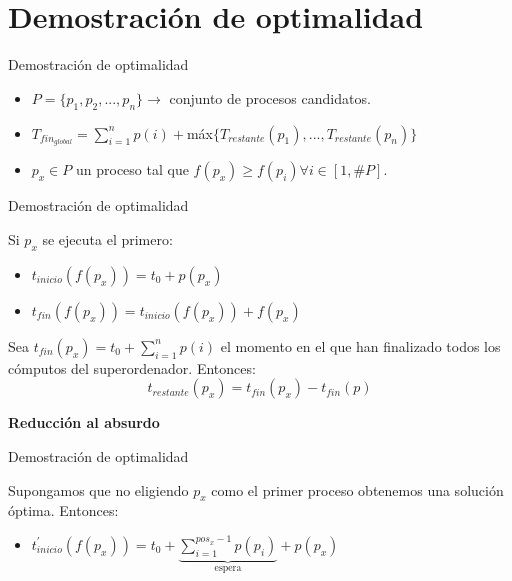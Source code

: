 \documentclass{beamer}
\begin{document}
\section{Demostración de optimalidad}

\begin{frame}[fragile]{Demostración de optimalidad}

\begin{itemize}
	\item $P=\{p_1,p_2,...,p_n\} \rightarrow $ conjunto de procesos candidatos.
	\item $T_{fin_{global}} = \sum_{i=1}^{n} p(i) + $máx$\{T_{restante}(p_1),...,T_{restante}(p_n)\}$
	\item $p_x \in P$ un proceso tal que $f(p_x)\geq f(p_i) \forall i \in [1,\#P]$.
\end{itemize}

\end{frame}

\begin{frame}[fragile]{Demostración de optimalidad}

Si $p_x$ se ejecuta el primero:
\begin{itemize}
	\item $t_{inicio}(f(p_x))= t_0 + p(p_x)$
	\item $t_{fin}(f(p_x))= t_{inicio}(f(p_x)) + f(p_x)$
\end{itemize}

\vspace{0.2cm}

Sea $t_{fin}(p_x)=t_0 + \sum^{n}_{i=1}p(i)$ el momento en el que han finalizado todos los cómputos del superordenador. Entonces:
\begin{equation*}
	t_{restante}(p_x)=t_{fin}(p_x) - t_{fin}(p)
\end{equation*}
\begin{center}
\textbf{Reducción al absurdo}
\end{center}
\end{frame}

\begin{frame}[fragile]{Demostración de optimalidad}

Supongamos que no eligiendo $p_x$ como el primer proceso obtenemos una solución óptima. Entonces:
\begin{itemize}
\item $t_{inicio}^{\prime}(f(p_x))= t_0 + 
\underbrace{\sum^{pos_x-1}_{i=1} p(p_i)}_{\text{espera}} + p(p_x) $
\end{itemize}
\end{frame}
\end{document}
